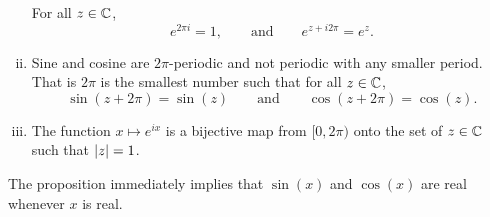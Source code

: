 \begin{prop}
\begin{enumerate}[(i)]
For all $z \in {\mathbb{C}}$, 
\begin{equation*}
e^{2\pi i} = 1, \qquad \text{and} \qquad e^{z + i 2\pi} = e^z.
\end{equation*}
\item
Sine and cosine are $2\pi$-periodic and not periodic with any smaller
period.  That is $2\pi$ is the smallest number such that for all $z \in {\mathbb{C}}$,
\begin{equation*}
\sin(z+2\pi) = \sin(z)
\qquad \text{and} \qquad
\cos(z+2\pi) = \cos(z) .
\end{equation*}
\item
The function $x \mapsto e^{ix}$ is a bijective map from $[0,2\pi)$
onto the set of $z \in {\mathbb{C}}$ such that $\lvert {z} \rvert = 1$.
\end{enumerate}
\end{prop}

The proposition immediately implies that $\sin(x)$ and $\cos(x)$ are 
real whenever $x$ is real.


